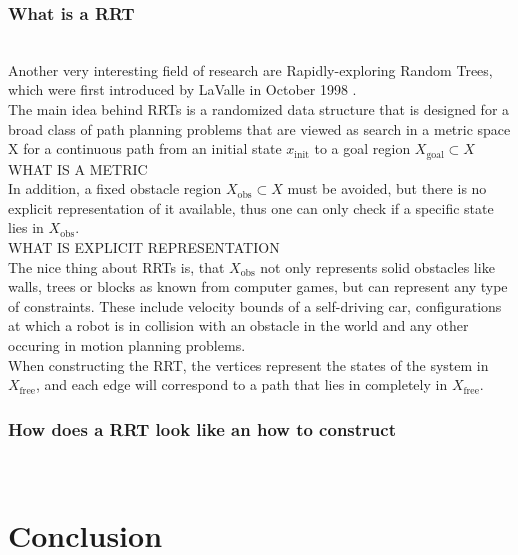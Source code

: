 \documentclass[conference]{IEEEtran}
\begin{document}
\subsubsection{What is a RRT}
\quad \\
Another very interesting field of research are Rapidly-exploring Random Trees, which were first introduced by LaValle in October 1998 \cite{LaValle.October1998}.\\
The main idea behind RRTs is a randomized data structure that is designed for a broad class of path planning problems that are viewed as search in a metric space X for a continuous path from an initial state $x_{\text{init}}$ to a goal region $X_\text{goal} \subset X$\\
WHAT IS A METRIC\\
In addition, a fixed obstacle region $X_\text{obs} \subset X$ must be avoided, but there is no explicit representation of it available, thus one can only check if a specific state lies in $X_\text{obs}$.\\
WHAT IS EXPLICIT REPRESENTATION\\
The nice thing about RRTs is, that $X_\text{obs}$ not only represents solid obstacles like walls, trees or blocks as known from computer games, but can represent any type of constraints. These include velocity bounds of a self-driving car, configurations at which a robot is in collision with an obstacle in the world and any other occuring in motion planning problems.\\
When constructing the RRT, the vertices represent the states of the system in $X_\text{free}$, and each edge will correspond to a path that lies in completely in $X_\text{free}$.\\

\subsubsection{How does a RRT look like an how to construct}
\quad \\






\section{Conclusion}
\end{document}

